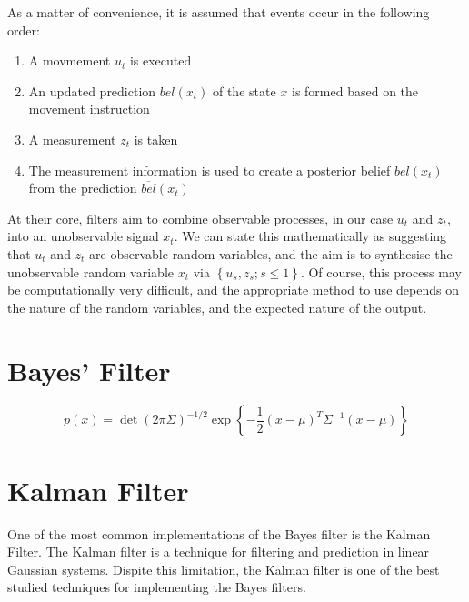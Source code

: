 \documentclass[english]{article}
\begin{document}
As a matter of convenience, it is assumed that events occur in the following order:
\begin{enumerate}
  \item A movmement $u_t$ is executed 
  \item An updated prediction $\overline{bel}(x_t)$ of the state $x$ is formed based on the movement instruction
  \item A measurement $z_t$ is taken
  \item The measurement information is used to create a posterior belief $bel(x_t)$ from the prediction $\overline{bel}(x_t)$
\end{enumerate}

At their core, filters aim to combine observable processes, in our case $u_t$ and $z_t$, into an unobservable signal $x_t$. We can state this mathematically as suggesting that $u_t$ and $z_t$ are observable random variables, and the aim is to synthesise the unobservable random variable $x_t$ via $\left\{u_s,z_s; s \le 1\right\}$. Of course, this process may be computationally very difficult, and the appropriate method to use depends on the nature of the random variables, and the expected nature of the output.

\section*{Bayes' Filter}

\begin{equation}
\label{eq:mvarnormal}
p(x) = \det(2 \pi \Sigma)^{-1/2} \exp\left\{-\frac{1}{2}(x-\mu)^T \Sigma^{-1}(x-\mu)\right\}
\end{equation}

\section*{Kalman Filter}

One of the most common implementations of the Bayes filter is the Kalman Filter. The Kalman filter is a technique for filtering and prediction in linear Gaussian systems. Dispite this limitation, the Kalman filter is one of the best studied techniques for implementing the Bayes filters.
\end{document}
